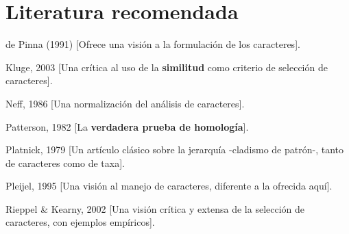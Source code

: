 \section*{Literatura recomendada}

%
%

de Pinna (1991) [Ofrece una visi\'on a la formulaci\'on de los caracteres].

Kluge, 2003 [Una cr\'itica al uso de la \textbf{similitud} como criterio de selecci\'on de caracteres].

Neff, 1986 [Una normalizaci\'on del an\'alisis de caracteres].

Patterson, 1982 [La \textbf{verdadera prueba de homolog\'ia}].

Platnick, 1979 [Un art\'iculo cl\'asico sobre la jerarqu\'ia -cladismo de patr\'on-, tanto de caracteres como de taxa].

Pleijel, 1995 [Una visi\'on al manejo de caracteres, diferente a la ofrecida aqu\'i].

Rieppel \& Kearny, 2002 [Una visi\'on cr\'itica y extensa de la selecci\'on de caracteres, con ejemplos emp\'iricos].

